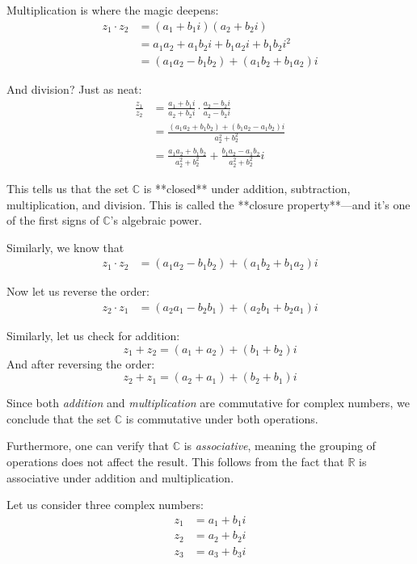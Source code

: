 Multiplication is where the magic deepens:
\begin{align*}
z_1 \cdot z_2 &= (a_1 + b_1 i)(a_2 + b_2 i) \\
&= a_1 a_2 + a_1 b_2 i + b_1 a_2 i + b_1 b_2 i^2 \\
&= (a_1 a_2 - b_1 b_2) + (a_1 b_2 + b_1 a_2)i
\end{align*}

And division? Just as neat:
\begin{align*}
\frac{z_1}{z_2} &= \frac{a_1 + b_1 i}{a_2 + b_2 i} \cdot \frac{a_2 - b_2 i}{a_2 - b_2 i} \\
&= \frac{(a_1 a_2 + b_1 b_2) + (b_1 a_2 - a_1 b_2)i}{a_2^2 + b_2^2} \\
&= \frac{a_1 a_2 + b_1 b_2}{a_2^2 + b_2^2} + \frac{b_1 a_2 - a_1 b_2}{a_2^2 + b_2^2}i
\end{align*}

This tells us that the set $\mathbb{C}$ is **closed** under addition, subtraction, multiplication, and division. This is called the **closure property**—and it’s one of the first signs of $\mathbb{C}$'s algebraic power.

Similarly, we know that
\begin{align*}
z_1 \cdot z_2 &= (a_1 a_2 - b_1 b_2) + (a_1 b_2 + b_1 a_2)i
\end{align*}

Now let us reverse the order:
\begin{align*}
z_2 \cdot z_1 &= (a_2 a_1 - b_2 b_1) + (a_2 b_1 + b_2 a_1)i
\end{align*}

Similarly, let us check for addition:
\[
z_1 + z_2 = (a_1 + a_2) + (b_1 + b_2)i
\]
And after reversing the order:
\[
z_2 + z_1 = (a_2 + a_1) + (b_2 + b_1)i
\]

Since both \emph{addition} and \emph{multiplication} are commutative for complex numbers, we conclude that the set $\mathbb{C}$ is commutative under both operations.

Furthermore, one can verify that $\mathbb{C}$ is \emph{associative}, meaning the grouping of operations does not affect the result. This follows from the fact that $\mathbb{R}$ is associative under addition and multiplication.

Let us consider three complex numbers:
\begin{align*}
z_1 &= a_1 + b_1 i \\
z_2 &= a_2 + b_2 i \\
z_3 &= a_3 + b_3 i
\end{align*}

